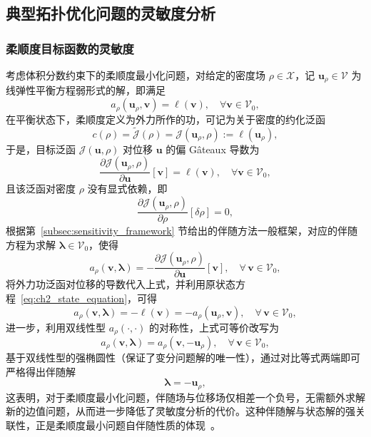 \subsection{典型拓扑优化问题的灵敏度分析}
\label{subsec:sensitivity_derivation}

\subsubsection*{柔顺度目标函数的灵敏度}

考虑体积分数约束下的柔顺度最小化问题，对给定的密度场 $\rho\in\mathcal{X}$，记 $\boldsymbol{u}_\rho\in\mathcal{V}$ 为线弹性平衡方程弱形式的解，即满足
\begin{equation}
	a_\rho(\boldsymbol{u}_\rho,\boldsymbol{v}) = \ell(\boldsymbol{v}),\quad \forall \boldsymbol{v}\in\mathcal{V}_0,
	\label{eq:ch2_state_equation}
\end{equation}
在平衡状态下，柔顺度定义为外力所作的功，可记为关于密度的约化泛函
\[
c(\rho) = \tilde{\mathcal{J}}(\rho) = \mathcal{J}(\boldsymbol{u}_\rho,\rho) := \ell(\boldsymbol{u}_\rho),
\]
于是，目标泛函 $\mathcal{J}(\boldsymbol{u},\rho)$ 对位移 $\boldsymbol{u}$ 的偏 Gâteaux 导数为
\[
\frac{\partial\mathcal{J}(\boldsymbol{u}_\rho,\rho)}{\partial\boldsymbol{u}}[\boldsymbol{v}] = \ell(\boldsymbol{v}),\quad \forall \boldsymbol{v}\in\mathcal{V}_0,
\]
且该泛函对密度 $\rho$ 没有显式依赖，即
\[
\frac{\partial\mathcal{J}(\boldsymbol{u}_\rho,\rho)}{\partial\rho}[\delta\rho] = 0,
\]
根据第~\ref{subsec:sensitivity_framework} 节给出的伴随方法一般框架，对应的伴随方程为求解 $\boldsymbol{\lambda}\in\mathcal{V}_0$，使得
\[
a_\rho(\boldsymbol{v},\boldsymbol{\lambda}) = -\frac{\partial\mathcal{J}( \boldsymbol{u}_\rho,\rho)}{\partial\boldsymbol{u}}[\boldsymbol{v}],\quad \forall\,\boldsymbol{v}\in\mathcal{V}_0,
\]
将外力功泛函对位移的导数代入上式，并利用原状态方程~\eqref{eq:ch2_state_equation}，可得
\[
a_\rho(\boldsymbol{v},\boldsymbol{\lambda}) = -\ell(\boldsymbol{v}) = -a_\rho(\boldsymbol{u}_\rho,\boldsymbol{v}), \quad \forall\,\boldsymbol{v}\in\mathcal{V}_0,
\]
进一步，利用双线性型 $a_\rho(\cdot,\cdot)$ 的对称性，上式可等价改写为
\[
a_\rho(\boldsymbol{v},\boldsymbol{\lambda}) = a_\rho(\boldsymbol{v},-\boldsymbol{u}_\rho), \quad \forall\,\boldsymbol{v}\in\mathcal{V}_0,
\]
基于双线性型的强椭圆性（保证了变分问题解的唯一性），通过对比等式两端即可严格得出伴随解
\[
\boldsymbol{\lambda} = -\boldsymbol{u}_\rho,
\]
这表明，对于柔顺度最小化问题，伴随场与位移场仅相差一个负号，无需额外求解新的边值问题，从而进一步降低了灵敏度分析的代价。这种伴随解与状态解的强关联性，正是柔顺度最小问题自伴随性质的体现~\cite{bendsoeTopologyOptimization2004a}。

